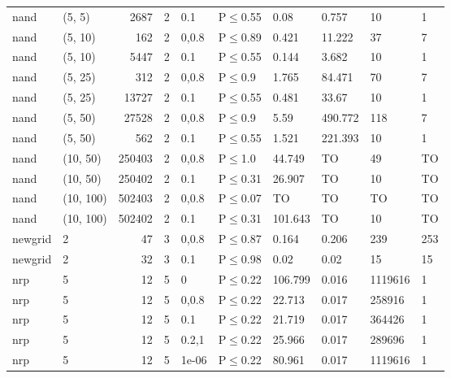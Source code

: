 \begin{longtable}{llrrllllll}
 nand          & (5, 5)    &   	2687 &    2 & 0.1   & P$\leq$0.55  & 0.08    & 0.757   & 10      & 1    \\
 nand          & (5, 10)   &    	162 &    2 & 0,0.8 & P$\leq$0.89  & 0.421   & 11.222  & 37      & 7    \\
 nand          & (5, 10)   &   	5447 &    2 & 0.1   & P$\leq$0.55  & 0.144   & 3.682   & 10      & 1    \\
 nand          & (5, 25)   &    	312 &    2 & 0,0.8 & P$\leq$0.9   & 1.765   & 84.471  & 70      & 7    \\
 nand          & (5, 25)   &  	13727 &    2 & 0.1   & P$\leq$0.55  & 0.481   & 33.67   & 10      & 1    \\
 nand          & (5, 50)   &  	27528 &    2 & 0,0.8 & P$\leq$0.9   & 5.59    & 490.772 & 118     & 7    \\
 nand          & (5, 50)   &    	562 &    2 & 0.1   & P$\leq$0.55  & 1.521   & 221.393 & 10      & 1    \\
 nand          & (10, 50)  & 	250403 &    2 & 0,0.8 & P$\leq$1.0   & 44.749  & TO      & 49      & TO   \\
 nand          & (10, 50)  & 	250402 &    2 & 0.1   & P$\leq$0.31  & 26.907  & TO      & 10      & TO   \\
 nand          & (10, 100) & 	502403 &    2 & 0,0.8 & P$\leq$0.07  & TO      & TO      & TO      & TO   \\
 nand          & (10, 100) & 	502402 &    2 & 0.1   & P$\leq$0.31  & 101.643 & TO      & 10      & TO   \\
 newgrid       & 2         &     	47 &    3 & 0,0.8 & P$\leq$0.87  & 0.164   & 0.206   & 239     & 253  \\
 newgrid       & 2         &     	32 &    3 & 0.1   & P$\leq$0.98  & 0.02    & 0.02    & 15      & 15   \\
 nrp           & 5         &     	12 &    5 & 0     & P$\leq$0.22  & 106.799 & 0.016   & 1119616 & 1    \\
 nrp           & 5         &     	12 &    5 & 0,0.8 & P$\leq$0.22  & 22.713  & 0.017   & 258916  & 1    \\
 nrp           & 5         &     	12 &    5 & 0.1   & P$\leq$0.22  & 21.719  & 0.017   & 364426  & 1    \\
 nrp           & 5         &     	12 &    5 & 0.2,1 & P$\leq$0.22  & 25.966  & 0.017   & 289696  & 1    \\
 nrp           & 5         &     	12 &    5 & 1e-06 & P$\leq$0.22  & 80.961  & 0.017   & 1119616 & 1    \\

\end{longtable}
